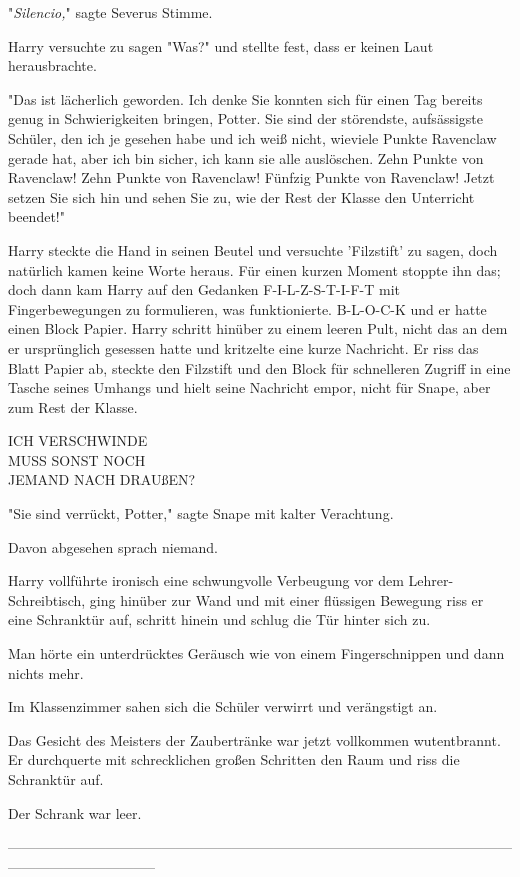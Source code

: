 {"\emph{Silencio,}" sagte Severus Stimme.

Harry versuchte zu sagen "Was?" und stellte fest, dass er keinen Laut herausbrachte.

"Das ist lächerlich geworden. Ich denke Sie konnten sich für einen Tag bereits genug in Schwierigkeiten bringen, Potter. Sie sind der störendste, aufsässigste Schüler, den ich je gesehen habe und ich weiß nicht, wieviele Punkte Ravenclaw gerade hat, aber ich bin sicher, ich kann sie alle auslöschen. Zehn Punkte von Ravenclaw! Zehn Punkte von Ravenclaw! Fünfzig Punkte von Ravenclaw! Jetzt setzen Sie sich hin und sehen Sie zu, wie der Rest der Klasse den Unterricht beendet!"

Harry steckte die Hand in seinen Beutel und versuchte 'Filzstift' zu sagen, doch natürlich kamen keine Worte heraus. Für einen kurzen Moment stoppte ihn das; doch dann kam Harry auf den Gedanken F-I-L-Z-S-T-I-F-T mit Fingerbewegungen zu formulieren, was funktionierte. B-L-O-C-K und er hatte einen Block Papier. Harry schritt hinüber zu einem leeren Pult, nicht das an dem er ursprünglich gesessen hatte und kritzelte eine kurze Nachricht. Er riss das Blatt Papier ab, steckte den Filzstift und den Block für schnelleren Zugriff in eine Tasche seines Umhangs und hielt seine Nachricht empor, nicht für Snape, aber zum Rest der Klasse.

ICH VERSCHWINDE\\ MUSS SONST NOCH\\ JEMAND NACH DRAUßEN?

"Sie sind verrückt, Potter," sagte Snape mit kalter Verachtung.

Davon abgesehen sprach niemand.

Harry vollführte ironisch eine schwungvolle Verbeugung vor dem Lehrer-Schreibtisch, ging hinüber zur Wand und mit einer flüssigen Bewegung riss er eine Schranktür auf, schritt hinein und schlug die Tür hinter sich zu.

Man hörte ein unterdrücktes Geräusch wie von einem Fingerschnippen und dann nichts mehr.

Im Klassenzimmer sahen sich die Schüler verwirrt und verängstigt an.

Das Gesicht des Meisters der Zaubertränke war jetzt vollkommen wutentbrannt. Er durchquerte mit schrecklichen großen Schritten den Raum und riss die Schranktür auf.

Der Schrank war leer.

--------------------------------------------------------------------------------------------------------------------------------------------

}
